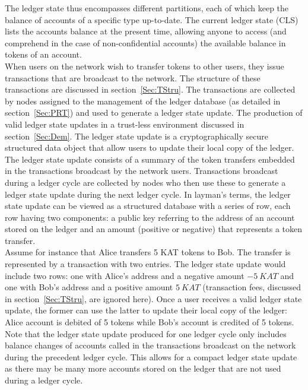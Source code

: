The ledger state thus encompasses different partitions, each of which keep the balance of accounts of a specific type up-to-date. The current ledger state (CLS) lists the accounts balance at the present time, allowing anyone to access (and comprehend in the case of non-confidential accounts) the available balance in tokens of an account. \\

When users on the network wish to transfer tokens to other users, they issue transactions that are broadcast to the network. The structure of these transactions are discussed in section~\ref{Sec:TStru}. The transactions are collected by nodes assigned to the management of the ledger database (as detailed in section~\ref{Sec:PRT}) and used to generate a ledger state update. The production of valid ledger state updates in a trust-less environment discussed in section~\ref{Sec:Dem}. The ledger state update is a cryptographically secure structured data object that allow users to update their local copy of the ledger. \\

The ledger state update consists of a summary of the token transfers embedded in the transactions broadcast by the network users. Transactions broadcast during a ledger cycle are collected by nodes who then use these to generate a ledger state update during the next ledger cycle. In layman's terms, the ledger state update can be viewed as a structured database with a series of row, each row having two components: a public key referring to the address of an account stored on the ledger and an amount (positive or negative) that represents a token transfer.\\ 

Assume for instance that Alice transfers 5 KAT tokens to Bob. The transfer is represented by a transaction with two entries. The ledger state update would include two rows: one with Alice's address and a negative amount $-5~KAT$ and one with Bob's address and a positive amount $5~KAT$ (transaction fees, discussed in section~\ref{Sec:TStru}, are ignored here). Once a user receives a valid ledger state update, the former can use the latter to update their local copy of the ledger: Alice account is debited of 5 tokens while Bob's account is credited of 5 tokens. Note that the ledger state update produced for one ledger cycle only includes balance changes of accounts called in the transactions broadcast on the network during the precedent ledger cycle. This allows for a compact ledger state update as there may be many more accounts stored on the ledger that are not used during a ledger cycle.\\

